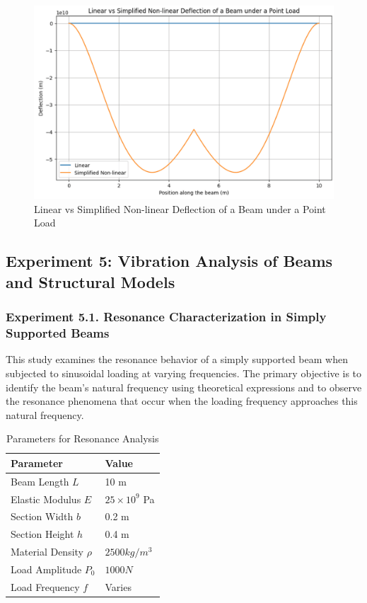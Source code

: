 \documentclass[conference]{IEEEtran}
\begin{document}
\begin{figure}[ht]
\centering
\includegraphics[width=\linewidth]{7.png}
\caption{Linear vs Simplified Non-linear Deflection of a Beam under a Point Load}
\label{fig:nonlinear_deflection}
\end{figure}


\subsection{Experiment 5: Vibration Analysis of Beams and Structural Models}

\subsubsection{Experiment 5.1. Resonance Characterization in Simply Supported Beams}
This study examines the resonance behavior of a simply supported beam when subjected to sinusoidal loading at varying frequencies. The primary objective is to identify the beam's natural frequency using theoretical expressions and to observe the resonance phenomena that occur when the loading frequency approaches this natural frequency.

\begin{table}[ht]
\centering
\caption{Parameters for Resonance Analysis}
\label{tab:experiment5params}
\begin{tabular}{l l}
\hline
\textbf{Parameter} & \textbf{Value} \\
\hline
Beam Length \( L \) & 10 m \\
Elastic Modulus \( E \) & \( 25 \times 10^9 \) Pa \\
Section Width \( b \) & 0.2 m \\
Section Height \( h \) & 0.4 m \\
Material Density \( \rho \) & \( 2500 kg/m^3 \) \\
Load Amplitude \( P_0 \) & \( 1000 N \) \\
Load Frequency \( f \) & Varies \\
\hline
\end{tabular}
\end{table}
\end{document}

